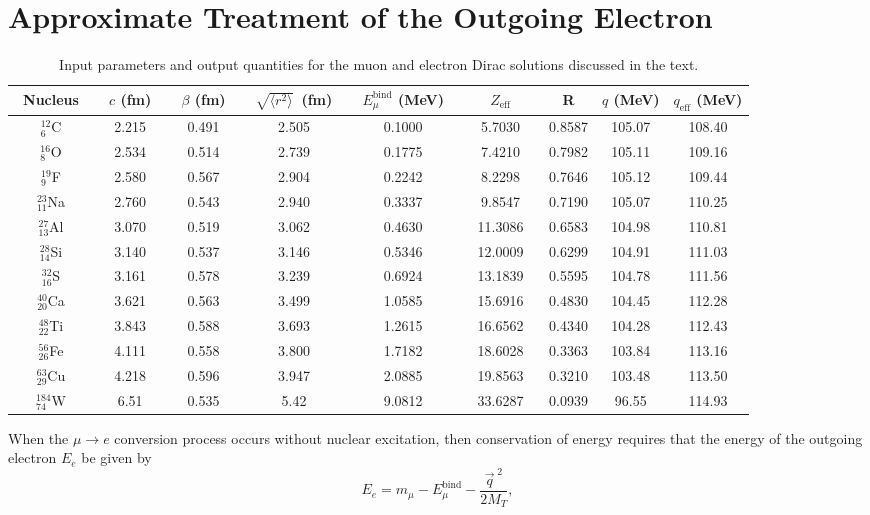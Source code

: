 \documentclass{book}[12pt]
\begin{document}
\section{Approximate Treatment of the Outgoing Electron}
\begin{table*}
\centering
 \begin{tabular}{|c|c|c|c|c|c|c|c|c|}
\hline
\hline
 ~Nucleus~ & ~$c$ (fm)~&  ~$\beta$ (fm)~ &~$\sqrt{\langle r^2 \rangle}$~(fm)~& ~$E_\mu^\mathrm{bind}$ (MeV)~  & ~~~$Z_\mathrm{eff}$~~~ &  R & $q$ (MeV)  & $q_\mathrm{eff}$ (MeV)  \\[0.4cm]
\hline
$^{12}_6$C & 2.215 & 0.491 & 2.505 & 0.1000 & 5.7030 & 0.8587 & 105.07 & 108.40 \\
$^{16}_8$O & 2.534 & 0.514 & 2.739 & 0.1775 & 7.4210 & 0.7982 &  105.11 & 109.16 \\
$^{19}_9$F & 2.580 & 0.567 & 2.904 & 0.2242 & 8.2298 & 0.7646 & 105.12 & 109.44 \\
$^{23}_{11}$Na & 2.760 & 0.543 & 2.940 & 0.3337 & 9.8547 & 0.7190 &  105.07 & 110.25 \\
$^{27}_{13}$Al & 3.070 & 0.519 & 3.062 & 0.4630 & 11.3086 & 0.6583 & 104.98 & 110.81 \\
$^{28}_{14}$Si & 3.140 & 0.537 & 3.146 & 0.5346 & 12.0009 & 0.6299 & 104.91 & 111.03 \\
$^{32}_{16}$S & 3.161 & 0.578 & 3.239 &  0.6924 &  13.1839 & 0.5595 & 104.78 &  111.56 \\
$^{40}_{20}$Ca & 3.621 & 0.563 & 3.499 & 1.0585 & 15.6916 & 0.4830 & 104.45 & 112.28 \\
$^{48}_{22}$Ti & 3.843 & 0.588 & 3.693 & 1.2615 & 16.6562 & 0.4340 &  104.28 & 112.43 \\
$^{56}_{26}$Fe & 4.111 & 0.558 & 3.800 & 1.7182 & 18.6028 & 0.3363 & 103.84 & 113.16 \\
$^{63}_{29}$Cu & 4.218 & 0.596 & 3.947 & 2.0885 & 19.8563 & 0.3210 & 103.48 & 113.50 \\
$^{184}_{74}$W & 6.51 & 0.535 & 5.42 & 9.0812 & 33.6287 & 0.0939 & 96.55 & 114.93\\[0.15cm]
 \hline
 \end{tabular}
  \caption{\label{tab:input}Input parameters and output quantities for the muon and electron Dirac solutions discussed in the text.}
\end{table*}
When the $\mu\rightarrow e$ conversion process occurs without nuclear excitation, then conservation of energy requires that the energy of the outgoing electron $E_e$ be given by
\begin{equation}
E_e=m_{\mu}-E^\mathrm{bind}_{\mu}-\frac{\vec{q}^{\;2}}{2M_T},
\end{equation}
\end{document}
